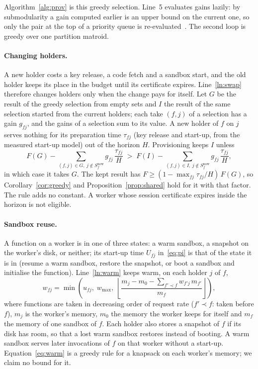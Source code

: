 Algorithm~\ref{alg:prov} is this greedy selection. Line~5 evaluates gains lazily: by submodularity a gain computed
earlier is an upper bound on the current one, so only the pair at the top of a priority queue is
re-evaluated~\cite{minoux1978}. The second loop is greedy over one partition matroid.

\paragraph{Changing holders.} A new holder costs a key release, a code fetch and a sandbox start, and the old holder
keeps its place in the budget until its certificate expires. Line~\ref{ln:swap} therefore changes holders only when
the change pays for itself. Let $G$ be the result of the greedy selection from empty sets and $I$ the result of the
same selection started from the current holders; each take $(f,j)$ of a selection has a gain $g_{fj}$, and the gains
of a selection sum to its value. A new holder of $f$ on $j$ serves nothing for its preparation time $\tau_{fj}$ (key
release and start-up, from the measured start-up model) out of the horizon $H$. Provisioning keeps $I$ unless
\begin{equation}
F(G) - \sum_{(f,j) \in G,\ j \notin S^{\mathrm{now}}_f} g_{fj}\,\frac{\tau_{fj}}{H} \;>\;
F(I) - \sum_{(f,j) \in I,\ j \notin S^{\mathrm{now}}_f} g_{fj}\,\frac{\tau_{fj}}{H},
\label{eq:swap}
\end{equation}
in which case it takes $G$. The kept result has $F \ge (1 - \max_{fj} \tau_{fj}/H)\,F(G)$, so
Corollary~\ref{cor:greedy} and Proposition~\ref{prop:shared} hold for it with that factor. The rule adds no constant.
A worker whose session certificate expires inside the horizon is not eligible.

\paragraph{Sandbox reuse.} A function on a worker is in one of three states: a warm sandbox, a snapshot on the
worker's disk, or neither; its start-up time $U_{fj}$ in~\eqref{eq:pi} is that of the state it is in (resume a warm
sandbox, restore the snapshot, or boot a sandbox and initialise the function). Line~\ref{ln:warm} keeps warm, on each
holder $j$ of $f$,
\begin{equation}
w_{fj} = \min\!\left(u_{fj},\; w_{\max},\; \left\lfloor \frac{m_j - m_0 - \sum_{f' \prec f} w_{f'j}\,m_{f'}}{m_f}
\right\rfloor\right),
\label{eq:warm}
\end{equation}
where functions are taken in decreasing order of request rate ($f' \prec f$: taken before $f$), $m_j$ is the worker's
memory, $m_0$ the memory the worker keeps for itself and $m_f$ the memory of one sandbox of $f$. Each holder also
stores a snapshot of $f$ if its disk has room, so that a lost warm sandbox restores instead of booting. A warm sandbox
serves later invocations of $f$ on that worker without a start-up. Equation~\eqref{eq:warm} is a greedy rule for a knapsack on each worker's memory; we claim no bound for it.

